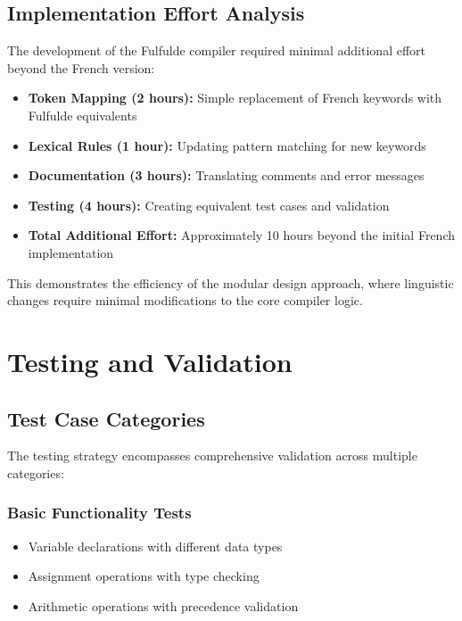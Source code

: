\documentclass[12pt,a4paper]{article}
\begin{document}
\subsection{Implementation Effort Analysis}

The development of the Fulfulde compiler required minimal additional effort beyond the French version:

\begin{itemize}
    \item \textbf{Token Mapping (2 hours):} Simple replacement of French keywords with Fulfulde equivalents
    \item \textbf{Lexical Rules (1 hour):} Updating pattern matching for new keywords
    \item \textbf{Documentation (3 hours):} Translating comments and error messages
    \item \textbf{Testing (4 hours):} Creating equivalent test cases and validation
    \item \textbf{Total Additional Effort:} Approximately 10 hours beyond the initial French implementation
\end{itemize}

This demonstrates the efficiency of the modular design approach, where linguistic changes require minimal modifications to the core compiler logic.

\section{Testing and Validation}

\subsection{Test Case Categories}

The testing strategy encompasses comprehensive validation across multiple categories:

\subsubsection{Basic Functionality Tests}

\begin{itemize}
    \item Variable declarations with different data types
    \item Assignment operations with type checking
    \item Arithmetic operations with precedence validation
\end{itemize}
\end{document}
